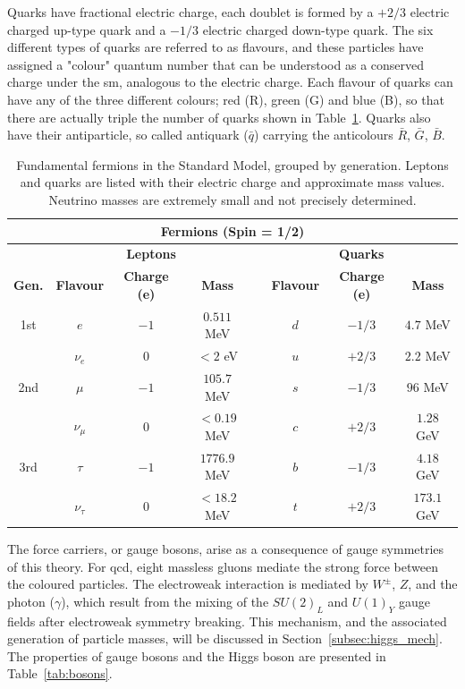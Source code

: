Quarks have fractional electric charge, each doublet is formed by a $+2/3$ electric charged up-type quark and a $-1/3$ electric charged down-type quark. The six different types of quarks are referred to as flavours, and these particles have assigned a "colour" quantum number that can be understood as a conserved charge under the \acrshort{sm}, analogous to the electric charge. Each flavour of quarks can have any of the three different colours;
red (R), green (G) and blue (B), so that there are actually triple the number of quarks
shown in Table~\ref{tab:fermions}. Quarks also have their antiparticle, so called antiquark ($\bar{q}$) carrying
the anticolours $\bar{R}$, $\bar{G}$, $\bar{B}$.
\begin{table}[htbp]
\centering
\small %
\renewcommand{\arraystretch}{1.2} %
\setlength{\tabcolsep}{4pt} %
\begin{tabular}{cccccccc}
\multicolumn{8}{c}{\textbf{Fermions (Spin = 1/2)}} \\
\toprule
 & \multicolumn{3}{c}{\textbf{Leptons}} & & \multicolumn{3}{c}{\textbf{Quarks}} \\
\midrule
\textbf{Gen.} & \textbf{Flavour} & \textbf{Charge (e)} & \textbf{Mass} & 
              & \textbf{Flavour} & \textbf{Charge (e)} & \textbf{Mass} \\
\midrule
1st & $e$ & $-1$ & $0.511$ MeV & & $d$ & $-1/3$ & $4.7$ MeV \\
    & $\nu_e$ & $0$ & $<2$ eV & & $u$ & $+2/3$ & $2.2$ MeV \\
2nd & $\mu$ & $-1$ & $105.7$ MeV & & $s$ & $-1/3$ & $96$ MeV \\
     & $\nu_\mu$ & $0$ & $<0.19$ MeV & & $c$ & $+2/3$ & $1.28$ GeV \\
3rd & $\tau$ & $-1$ & $1776.9$ MeV & & $b$ & $-1/3$ & $4.18$ GeV \\
     & $\nu_\tau$ & $0$ & $<18.2$ MeV & & $t$ & $+2/3$ & $173.1$ GeV \\
\bottomrule
\end{tabular}
\caption{Fundamental fermions in the Standard Model, grouped by generation. Leptons and quarks are listed with their electric charge and approximate mass values. Neutrino masses are extremely small and not precisely determined.}
\label{tab:fermions}
\end{table}
The force carriers, or gauge bosons, arise as a consequence of gauge symmetries of this theory. For \acrshort{qcd}, eight massless gluons mediate the strong force between the coloured particles. The electroweak interaction is mediated by $W^\pm$, $Z$, and the photon ($\gamma$), which result from the mixing of the $SU(2)_L$ and $U(1)_Y$ gauge fields after electroweak symmetry breaking. This mechanism, and the associated generation of particle masses, will be discussed in Section~\ref{subsec:higgs_mech}. The properties of gauge bosons and the Higgs boson are presented in Table~\ref{tab:bosons}.
